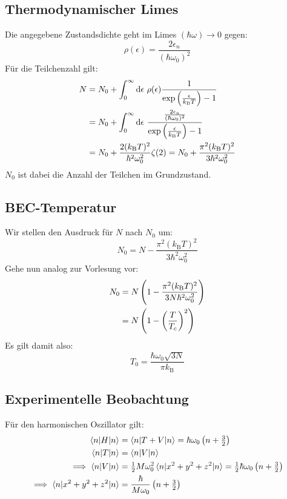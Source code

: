 \subsection{Thermodynamischer Limes}
Die angegebene Zustandsdichte geht im Limes $(\hbar \omega) \longrightarrow 0$ gegen:
\[\rho(\epsilon) = \frac{2\epsilon_n}{(\hbar \omega_0)^2} \]
Für die Teilchenzahl gilt:
\begin{align*}
N &= N_0 + \int_0^\infty \dif \epsilon \ \rho(\epsilon) \frac{1}{\exp\del{\frac{\epsilon}{k_\text{B} T}}-1} \\
&= N_0 + \int_0^\infty \dif \epsilon \  \frac{\frac{2\epsilon_n}{(\hbar \omega_0)^2}}{\exp\del{\frac{\epsilon}{k_\text{B} T}}-1} \\
&= N_0 + \frac{2(k_\text{B} T)^2}{\hbar^2 \omega_0^2} \zeta(2) = N_0 + \frac{\pi^2 (k_\text{B} T)^2}{3 \hbar^2 \omega_0^2}
\end{align*}
$N_0$ ist dabei die Anzahl der Teilchen im Grundzustand.

\subsection{BEC-Temperatur}
Wir stellen den Ausdruck für $N$ nach $N_0$ um:
\[N_0 = N - \frac{\pi^2 (k_\text{B} T)^2}{3 \hbar^2 \omega_0^2} \]
Gehe nun analog zur Vorlesung vor:
\begin{align*}
N_0 &= N\del{1 - \frac{\pi^2 (k_\text{B} T)^2}{3N \hbar^2 \omega_0^2}} \\
&= N \del{1-\del{\frac{T}{T_c}}^2} \\
\end{align*}
Es gilt damit also:
\[T_0 = \frac{\hbar \omega_0 \sqrt{3N}}{\pi k_\text{B}} \]

\subsection{Experimentelle Beobachtung}
Für den harmonischen Oszillator gilt:
\begin{align*}
\braket{n|H|n} &= \braket{n|T+V|n} = \hbar \omega_0 \del {n+\tfrac{3}{2}} \\
\braket{n|T|n} &= \braket{n|V|n} \\
\implies \braket{n|V|n} &= \tfrac{1}{2} M \omega_0^2 \braket{n|x^2+y^2+z^2|n} =  \tfrac{1}{2} \hbar \omega_0 \del {n+\tfrac{3}{2}} \\
\implies \braket{n|x^2+y^2+z^2|n} &= \frac{\hbar}{M\omega_0} \del{n+\tfrac{3}{2}}
\end{align*}




